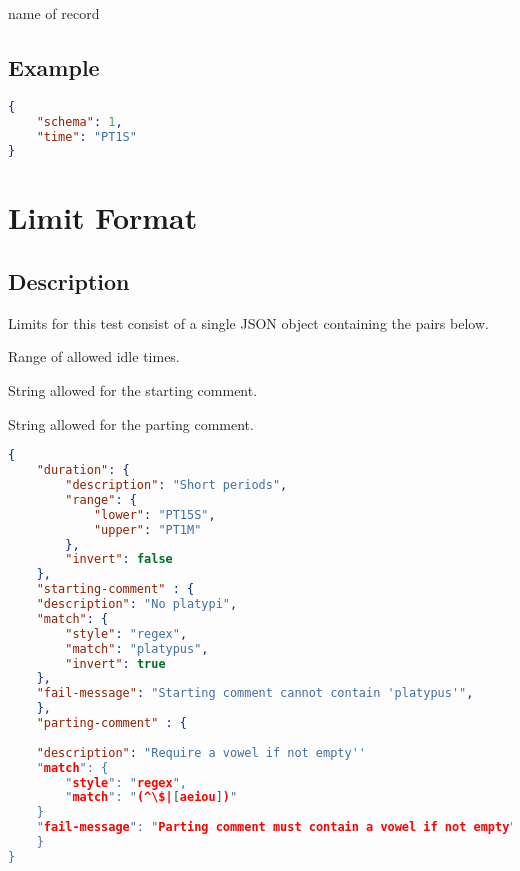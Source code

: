 \documentclass[10pt]{article}
\begin{document}
 name of record

\subsection{Example}
\begin{lstlisting}[language=json]
{
    "schema": 1,
    "time": "PT1S"
}
\end{lstlisting}



%
%

\section{Limit Format}

\subsection{Description}
Limits for this test consist of a single JSON object containing the
pairs below.  \seelimit

 Range of allowed idle times.

 String allowed for the starting comment.

 String allowed for the parting comment.


\example
\begin{lstlisting}[language=json]
{
    "duration": {
        "description": "Short periods",
        "range": {
            "lower": "PT15S",
            "upper": "PT1M"
        },
        "invert": false
    },
    "starting-comment" : {
	"description": "No platypi",
	"match": {
	    "style": "regex",
	    "match": "platypus",
	    "invert": true
	},
	"fail-message": "Starting comment cannot contain 'platypus'",
    },
    "parting-comment" : {
     
	"description": "Require a vowel if not empty''
	"match": {
	    "style": "regex",
	    "match": "(^\$|[aeiou])"
	}
	"fail-message": "Parting comment must contain a vowel if not empty", 
    }
}

\end{lstlisting}
\end{document}
